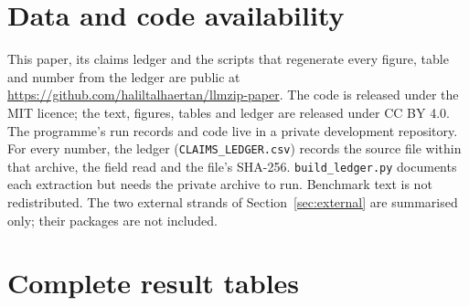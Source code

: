\documentclass[11pt,a4paper]{article}
\begin{document}


\section{Data and code availability}
This paper, its claims ledger and the scripts that regenerate every figure, table and number from the ledger are public at \url{https://github.com/haliltalhaertan/llmzip-paper}. The code is released under the MIT licence; the text, figures, tables and ledger are released under CC BY 4.0. The programme's run records and code live in a private development repository. For every number, the ledger (\texttt{CLAIMS\_LEDGER.csv}) records the source file within that archive, the field read and the file's SHA-256. \texttt{build\_ledger.py} documents each extraction but needs the private archive to run. Benchmark text is not redistributed. The two external strands of Section~\ref{sec:external} are summarised only; their packages are not included.




\FloatBarrier
\clearpage
\appendix
\section{Complete result tables}





\end{document}
